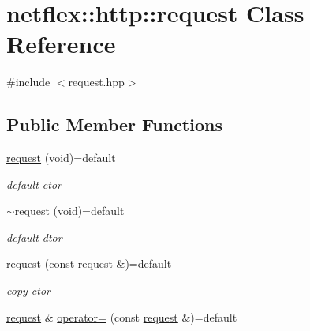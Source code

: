 \hypertarget{classnetflex_1_1http_1_1request}{}\section{netflex\+:\+:http\+:\+:request Class Reference}
\label{classnetflex_1_1http_1_1request}


{\ttfamily \#include $<$request.\+hpp$>$}

\subsection*{Public Member Functions}
\begin{DoxyCompactItemize}
\item 
\mbox{\label{classnetflex_1_1http_1_1request_a1c2202c8142807f69cd4bb627af2a3d2}} 
\hyperlink{classnetflex_1_1http_1_1request_a1c2202c8142807f69cd4bb627af2a3d2}{request} (void)=default
\begin{DoxyCompactList}\small\item\em default ctor \end{DoxyCompactList}\item 
\mbox{\label{classnetflex_1_1http_1_1request_ac69340af75304fa6dcecf111aa2963b0}} 
\hyperlink{classnetflex_1_1http_1_1request_ac69340af75304fa6dcecf111aa2963b0}{$\sim$request} (void)=default
\begin{DoxyCompactList}\small\item\em default dtor \end{DoxyCompactList}\item 
\mbox{\label{classnetflex_1_1http_1_1request_af184b288745bda0dc34aec705ec5807e}} 
\hyperlink{classnetflex_1_1http_1_1request_af184b288745bda0dc34aec705ec5807e}{request} (const \hyperlink{classnetflex_1_1http_1_1request}{request} \&)=default
\begin{DoxyCompactList}\small\item\em copy ctor \end{DoxyCompactList}\item 
\mbox{\label{classnetflex_1_1http_1_1request_aef5f7d7812a7fb94f85715fcdcf3686f}} 
\hyperlink{classnetflex_1_1http_1_1request}{request} \& \hyperlink{classnetflex_1_1http_1_1request_aef5f7d7812a7fb94f85715fcdcf3686f}{operator=} (const \hyperlink{classnetflex_1_1http_1_1request}{request} \&)=default

\end{DoxyCompactItemize}
